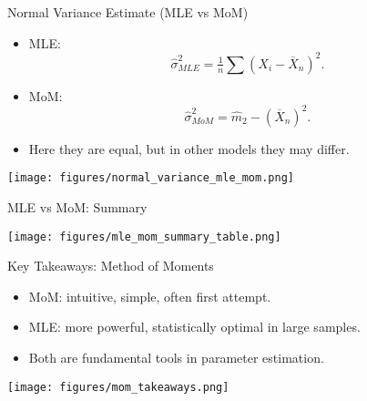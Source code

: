 \begin{frame}{Normal Variance Estimate (MLE vs MoM)}
  \begin{itemize}
    \item MLE:
      \[ \hat{\sigma}^2_{MLE} = \tfrac{1}{n}\sum (X_i - \overline{X}_n)^2. \]
    \item MoM:
      \[ \hat{\sigma}^2_{MoM} = \hat{m}_2 - (\overline{X}_n)^2. \]
    \item Here they are equal, but in other models they may differ.
  \end{itemize}
  \begin{center}
    \texttt{[image: figures/normal\_variance\_mle\_mom.png]}
  \end{center}
\end{frame}

\begin{frame}{MLE vs MoM: Summary}
  \begin{center}
    \texttt{[image: figures/mle\_mom\_summary\_table.png]}
  \end{center}
\end{frame}

\begin{frame}{Key Takeaways: Method of Moments}
  \begin{itemize}
    \item MoM: intuitive, simple, often first attempt.
    \item MLE: more powerful, statistically optimal in large samples.
    \item Both are fundamental tools in parameter estimation.
  \end{itemize}
  \begin{center}
    \texttt{[image: figures/mom\_takeaways.png]}
  \end{center}
\end{frame}

